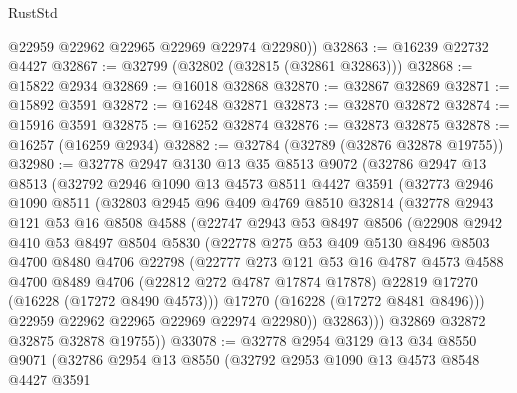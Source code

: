 \begin{lexlean}{RustStd}
\begin{coremodule}
        @22959
        @22962
        @22965
        @22969
        @22974
        @22980))
@32863 := @16239 @22732 @4427
@32867 := @32799 (@32802 (@32815 (@32861 @32863)))
@32868 := @15822 @2934
@32869 := @16018 @32868
@32870 := @32867 @32869
@32871 := @15892 @3591
@32872 := @16248 @32871
@32873 := @32870 @32872
@32874 := @15916 @3591
@32875 := @16252 @32874
@32876 := @32873 @32875
@32878 := @16257 (@16259 @2934)
@32882 := @32784 (@32789 (@32876 @32878 @19755))
@32980 := @32778
    @2947
    @3130
    @13
    @35
    @8513
    @9072
    (@32786
      @2947
      @13
      @8513
      (@32792
        @2946
        @1090
        @13
        @4573
        @8511
        @4427
        @3591
        (@32773
          @2946
          @1090
          @8511
          (@32803
            @2945
            @96
            @409
            @4769
            @8510
            @32814
            (@32778
              @2943
              @121
              @53
              @16
              @8508
              @4588
              (@22747
                @2943
                @53
                @8497
                @8506
                (@22908
                  @2942
                  @410
                  @53
                  @8497
                  @8504
                  @5830
                  (@22778
                    @275
                    @53
                    @409
                    @5130
                    @8496
                    @8503
                    @4700
                    @8480
                    @4706
                    @22798
                    (@22777
                      @273
                      @121
                      @53
                      @16
                      @4787
                      @4573
                      @4588
                      @4700
                      @8489
                      @4706
                      (@22812 @272 @4787 @17874 @17878)
                      @22819
                      @17270
                      (@16228 (@17272 @8490 @4573)))
                    @17270
                    (@16228 (@17272 @8481 @8496)))
                  @22959
                  @22962
                  @22965
                  @22969
                  @22974
                  @22980))
              @32863)))
        @32869
        @32872
        @32875
        @32878
        @19755))
@33078 := @32778
    @2954
    @3129
    @13
    @34
    @8550
    @9071
    (@32786
      @2954
      @13
      @8550
      (@32792
        @2953
        @1090
        @13
        @4573
        @8548
        @4427
        @3591

\end{coremodule}
\end{lexlean}
